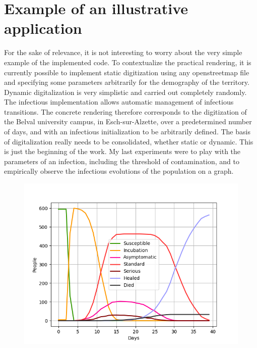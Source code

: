 \chapter{Example of an illustrative application}

For the sake of relevance, it is not interesting to worry about the very simple example of the implemented code. To contextualize the practical rendering, it is currently possible to implement static digitization using any openstreetmap file and specifying some parameters arbitrarily for the demography of the territory. Dynamic digitalization is very simplistic and carried out completely randomly. The infectious implementation allows automatic management of infectious transitions. The concrete rendering therefore corresponds to the digitization of the Belval university campus, in Esch-sur-Alzette, over a predetermined number of days, and with an infectious initialization to be arbitrarily defined. The basis of digitalization really needs to be consolidated, whether static or dynamic. This is just the beginning of the work. My last experiments were to play with the parameters of an infection, including the threshold of contamination, and to empirically observe the infectious evolutions of the population on a graph.\\

\pagebreak

\begin{figure}[h]
  \centering
  \includegraphics[width=\linewidth]{Media/ExperimentationBelval.png}
  \caption{}
  \label{fig:experimentationbelval}
\end{figure}

